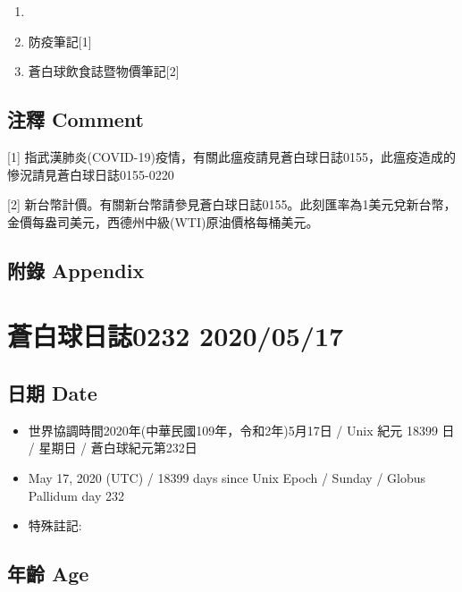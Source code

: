 \documentclass[
]{article}
\providecommand{\tightlist}{%
  \setlength{\itemsep}{0pt}\setlength{\parskip}{0pt}}
\begin{document}
\begin{enumerate}
\def\labelenumi{\arabic{enumi}.}
\item
\item
  防疫筆記{[}1{]}
\item
  蒼白球飲食誌暨物價筆記{[}2{]}
\end{enumerate}

\hypertarget{ux6ce8ux91cb-comment-15}{%
\subsection{注釋 Comment}\label{ux6ce8ux91cb-comment-15}}

{[}1{]}
指武漢肺炎(COVID-19)疫情，有關此瘟疫請見蒼白球日誌0155，此瘟疫造成的慘況請見蒼白球日誌0155-0220

{[}2{]}
新台幣計價。有關新台幣請參見蒼白球日誌0155。此刻匯率為1美元兌新台幣，金價每盎司美元，西德州中級(WTI)原油價格每桶美元。

\hypertarget{ux9644ux9304-appendix-15}{%
\subsection{附錄 Appendix}\label{ux9644ux9304-appendix-15}}

\hypertarget{ux84bcux767dux7403ux65e5ux8a8c0232-20200517}{%
\section{蒼白球日誌0232
2020/05/17}\label{ux84bcux767dux7403ux65e5ux8a8c0232-20200517}}

\hypertarget{ux65e5ux671f-date-16}{%
\subsection{日期 Date}\label{ux65e5ux671f-date-16}}

\begin{itemize}
\tightlist
\item
  世界協調時間2020年(中華民國109年，令和2年)5月17日 / Unix 紀元 18399 日
  / 星期日 / 蒼白球紀元第232日
\item
  May 17, 2020 (UTC) / 18399 days since Unix Epoch / Sunday / Globus
  Pallidum day 232
\item
  特殊註記:
\end{itemize}

\hypertarget{ux5e74ux9f61-age-16}{%
\subsection{年齡 Age}\label{ux5e74ux9f61-age-16}}
\end{document}
